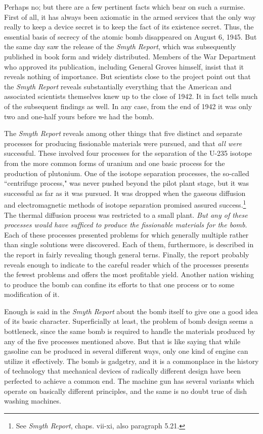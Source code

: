 Perhaps no; but there are a few pertinent facts which bear on such a surmise. First of all, it has always been axiomatic in the armed services that the only way really to keep a device secret is to keep the fact of its existence secret. Thus, the essential basis of secrecy of the atomic bomb disappeared on August 6, 1945. But the same day saw the release of the \emph{Smyth Report}, which was subsequently published in book form and widely distributed. Members of the War Department who approved its publication, including General Groves himself, insist that it reveals nothing of importance. But scientists close to the project point out that the \emph{Smyth Report} reveals substantially everything that the American and associated scientists themselves knew up to the close of 1942. It in fact tells much of the subsequent findings as well. In any case, from the end of 1942 it was only two and one-half yours before we had the bomb.

The \emph{Smyth Report} reveals among other things that five distinct and separate processes for producing fissionable materials were pursued, and that \emph{all were} successful. These involved four processes for the separation of the U-235 isotope from the more common forms of uranium and one basic process for the production of plutonium. One of the isotope separation processes, the so-called ``centrifuge process," was never pushed beyond the pilot plant stage, but it was successful as far as it was pursued. It was dropped when the gaseous diffusion and electromagnetic methods of isotope separation promised assured success.\footnote{See \emph{Smyth Report}, chaps. vii-xi, also paragraph 5.21.} The thermal diffusion process was restricted to a small plant. \emph{But any of these processes would have sufficed to produce the fissionable materials for the bomb}. Each of these processes presented problems for which generally multiple rather than single solutions were discovered. Each of them, furthermore, is described in the report in fairly revealing though general terns. Finally, the report probably reveals enough to indicate to the careful reader which of the processes presents the fewest problems and offers the most profitable yield. Another nation wishing to produce the bomb can confine its efforts to that one process or to some modification of it.

Enough is said in the \emph{Smyth Report} about the bomb itself to give one a good idea of its basic character. Superficially at least, the problem of bomb design seems a bottleneck, since the same bomb is required to handle the materials produced by any of the five processes mentioned above. But that is like saying that while gasoline can be produced in several different ways, only one kind of engine can utilize it effectively. The bomb is gadgetry, and it is a commonplace in the history of technology that mechanical devices of radically different design have been perfected to achieve a common end. The machine gun has several variants which operate on basically different principles, and the same is no doubt true of dish washing machines.

